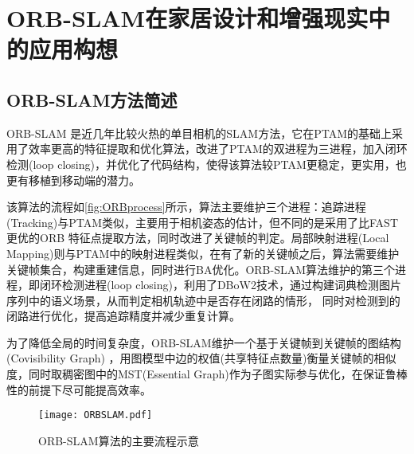 \chapter{ORB-SLAM在家居设计和增强现实中的应用构想}

\section{ORB-SLAM方法简述}

ORB-SLAM \cite{Mur-Artal2015}
是近几年比较火热的单目相机的SLAM方法，它在PTAM的基础上采用了效率更高的特征提取和优化算法，改进了PTAM的双进程为三进程，加入闭环检测(loop closing)，并优化了代码结构，使得该算法较PTAM更稳定，更实用，也更有移植到移动端的潜力。

该算法的流程如\autoref*{fig:ORBprocess}所示，算法主要维护三个进程：追踪进程(Tracking)与PTAM类似，主要用于相机姿态的估计，但不同的是采用了比FAST更优的ORB \cite{Strasdat2011}
特征点提取方法，同时改进了关键帧的判定。局部映射进程(Local Mapping)则与PTAM中的映射进程类似，在有了新的关键帧之后，算法需要维护关键帧集合，构建重建信息，同时进行BA优化。ORB-SLAM算法维护的第三个进程，即闭环检测进程(loop closing)，利用了DBoW2\cite{Galvez-Lopez2012}技术，通过构建词典检测图片序列中的语义场景，从而判定相机轨迹中是否存在闭路的情形，
同时对检测到的闭路进行优化，提高追踪精度并减少重复计算。

为了降低全局的时间复杂度，ORB-SLAM维护一个基于关键帧到关键帧的图结构(Covisibility Graph)
\cite{Galvez-Lopez2012}
，用图模型中边的权值(共享特征点数量)衡量关键帧的相似度，同时取稠密图中的MST(Essential Graph)作为子图实际参与优化，在保证鲁棒性的前提下尽可能提高效率。


\begin{figure}[!htbp]
\centering
\texttt{[image: ORBSLAM.pdf]}
\caption{ORB-SLAM算法的主要流程示意}
\label{fig:ORBprocess}
\end{figure}

